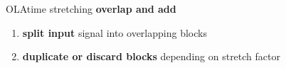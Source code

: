     \begin{frame}{OLA}{time stretching}
            \textbf{overlap and add}
            \begin{enumerate}
                \item	\textbf{split input} signal into overlapping blocks
                \pause
                \item	\textbf{duplicate or discard blocks} depending on stretch factor
            \end{enumerate}
    \end{frame}

